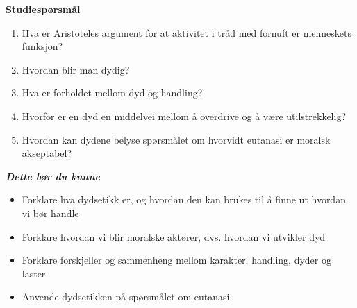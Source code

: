 \documentclass[11pt, a4paper]{article}
\newenvironment{sectionbox}[1][]{%
    \begin{sectionboxinner}
    \textbf{\large #1}
    \vspace{1pt}
    \newline
}{%
    \end{sectionboxinner}
}
\begin{document}
\begin{sectionbox}[Studiespørsmål]
\begin{enumerate}
    \item Hva er Aristoteles argument for at aktivitet i tråd med fornuft er menneskets funksjon?
    \item Hvordan blir man dydig?
    \item Hva er forholdet mellom dyd og handling?
    \item Hvorfor er en dyd en middelvei mellom å overdrive og å være utilstrekkelig?
    \item Hvordan kan dydene belyse spørsmålet om hvorvidt eutanasi er moralsk akseptabel?
\end{enumerate}

\textbf{\textit{Dette bør du kunne}}
\begin{itemize}
    \item Forklare hva dydsetikk er, og hvordan den kan brukes til å finne ut hvordan vi bør handle
    \item Forklare hvordan vi blir moralske aktører, dvs. hvordan vi utvikler dyd
    \item Forklare forskjeller og sammenheng mellom karakter, handling, dyder og laster
    \item Anvende dydsetikken på spørsmålet om eutanasi
\end{itemize}
\end{sectionbox}
\end{document}

